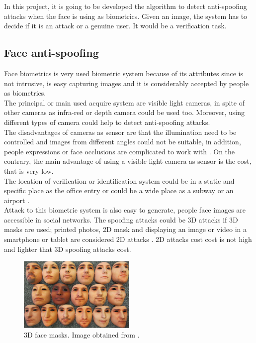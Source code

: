 In this project, it is going to be developed the algorithm to detect anti-spoofing attacks when the face is using as biometrics. Given an image, the system has to decide if it is an attack or a genuine user. It would be a verification task.\\

\subsection{Face anti-spoofing}
Face biometrics is very used biometric system because of its attributes since is not intrusive, is easy capturing images and it is considerably accepted by people as biometrics. \\

The principal or main used acquire system are visible light cameras, in spite of other cameras as infra-red or depth camera could be used too. Moreover, using different types of camera could help to detect anti-spoofing attacks.\\

The disadvantages of cameras as sensor are that the illumination need to be controlled and images from different angles could not be suitable, in addition, people expressions or face occlusions are complicated to work with \cite{survey2,2d_3d_face}. On the contrary, the main advantage of using a visible light camera as sensor is the cost, that is very low. \\

The location of verification or identification system could be in a static and specific place as the office entry or could be a wide place as a subway or an airport \cite{survey2}.\\

Attack to this biometric system is also easy to generate, people face images are accessible in social networks. The spoofing attacks could be 3D attacks if 3D masks are used; printed photos, 2D mask and displaying an image or video in a smartphone or tablet are considered 2D attacks \cite{2d_3d_face}. 2D attacks cost cost is not high \cite{distorsion} and lighter that 3D spoofing attacks cost.\\

\begin{figure}[htb]
\centering
\includegraphics[width=0.5\textwidth]{images_miscelaneus/fig_masks.png}
\caption{3D face masks. Image obtained from \cite{3dmask}.} \label{fig:3dMasks}
\end{figure}

